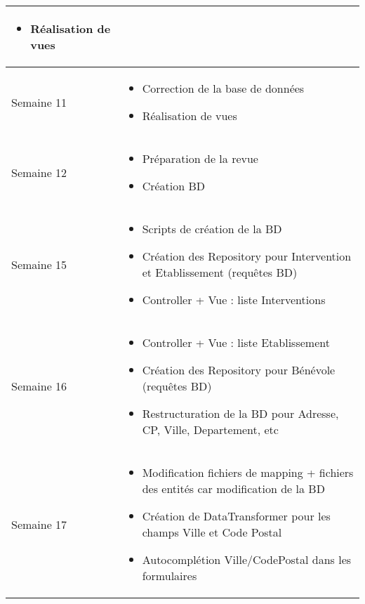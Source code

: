 \documentclass [a4paper] {article}
\begin{document}
\begin{longtable}{|>{\columncolor{gray!40}}p{2cm}|p{12cm}|}
\begin{itemize}
	\item Réalisation de vues
	\end{itemize} \\
	\hline
	Semaine 11 & \begin{itemize}
	\item Correction de la base de données
	\item Réalisation de vues 
	\end{itemize} \\
	\hline
	Semaine 12 & \begin{itemize}
	\item Préparation de la revue
	\item Création BD
	\end{itemize} \\
	\hline
	Semaine 15 & \begin{itemize}
	\item Scripts de création de la BD
	\item Création des Repository pour Intervention et Etablissement (requêtes BD)
	\item Controller + Vue : liste Interventions
	\end{itemize} \\
	\hline
	Semaine 16 & \begin{itemize}
	\item Controller + Vue : liste Etablissement
	\item Création des Repository pour Bénévole (requêtes BD)
	\item Restructuration de la BD pour Adresse, CP, Ville, Departement, etc
	\end{itemize} \\
	\hline
	Semaine 17 & \begin{itemize}
	\item Modification fichiers de mapping + fichiers des entités car modification de la BD
	\item Création de DataTransformer pour les champs Ville et Code Postal
	\item Autocomplétion Ville/CodePostal dans les formulaires 
	\end{itemize} \\
	\hline
\end{longtable}
\end{document}

